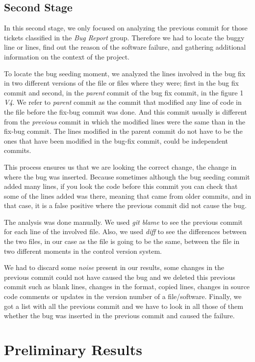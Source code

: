 \documentclass[ifip]{svmult}
\begin{document}
\subsection{Second Stage}
\label{subsec:second}
In this second stage, we only focused on analyzing the previous commit for those tickets classified in the \textit{Bug Report} group. Therefore we had to locate the buggy line or lines, find out the reason of the software failure, and gathering additional information on the context of the project.

To locate the bug seeding moment, we analyzed the lines involved in the bug fix in two different versions of the file or files where they were; first in the bug fix commit and second, in the \emph{parent} commit of the bug fix commit, in the figure 1 \textit{V4}. We refer to \emph{parent} commit as the commit that modified any line of code in the file before the fix-bug commit was done. And this commit usually is different from the \emph{previous} commit in which the modified lines were the same than in the fix-bug commit. The lines modified in the parent commit do not have to be the ones that have been modified in the bug-fix commit, could be independent commits.

This process ensures us that we are looking the correct change, the change in where the bug was inserted. Because sometimes although the bug seeding commit added many lines, if you look the code before this commit you can check that some of the lines added was there, meaning that came from older commits, and in that case, it is a false positive where the previous commit did not cause the bug. 

The analysis was done manually. We used \textit{git blame} to see the previous commit for each line of the involved file. Also, we used \textit{diff} to see the differences between the two files, in our case as the file is going to be the same, between the file in two different moments in the control version system.

We had to discard some \emph{noise} present in our results, some changes in the previous commit could not have caused the bug and we deleted this previous commit such as blank lines, changes in the format, copied lines, changes in source code comments or updates in the version number of a file/software. Finally, we got a list with all the previous commit and we have to look in all those of them whether the bug was inserted in the previous commit and caused the failure.
\section{Preliminary Results}
\label{sec:results}
\end{document}
